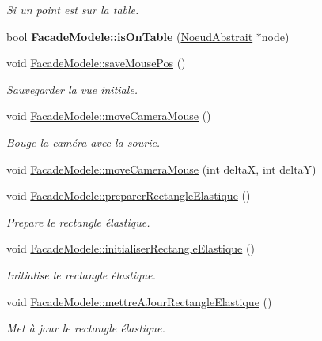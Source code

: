 \begin{DoxyCompactItemize}
\begin{DoxyCompactList}\small\item\em Si un point est sur la table. \end{DoxyCompactList}\item 
\hypertarget{group__inf2990_ga842a9426f91665baed35ec654cec6a20}{bool {\bfseries Facade\-Modele\-::is\-On\-Table} (\hyperlink{class_noeud_abstrait}{Noeud\-Abstrait} $\ast$node)}\label{group__inf2990_ga842a9426f91665baed35ec654cec6a20}

\item 
void \hyperlink{group__inf2990_gafd140af6e52aa738d9f301d4d5ea6530}{Facade\-Modele\-::save\-Mouse\-Pos} ()
\begin{DoxyCompactList}\small\item\em Sauvegarder la vue initiale. \end{DoxyCompactList}\item 
void \hyperlink{group__inf2990_gaba7107809948a77f8ef3bf2240bc2bc4}{Facade\-Modele\-::move\-Camera\-Mouse} ()
\begin{DoxyCompactList}\small\item\em Bouge la caméra avec la sourie. \end{DoxyCompactList}\item 
void \hyperlink{group__inf2990_ga2cab5c7a210e76f1c4f69d6ce2cb6403}{Facade\-Modele\-::move\-Camera\-Mouse} (int delta\-X, int delta\-Y)
\item 
void \hyperlink{group__inf2990_gaa5ea001f334158926e6c701478926ae9}{Facade\-Modele\-::preparer\-Rectangle\-Elastique} ()
\begin{DoxyCompactList}\small\item\em Prepare le rectangle élastique. \end{DoxyCompactList}\item 
void \hyperlink{group__inf2990_ga6ccf25bd92d3bae6dfeebaf051c768f4}{Facade\-Modele\-::initialiser\-Rectangle\-Elastique} ()
\begin{DoxyCompactList}\small\item\em Initialise le rectangle élastique. \end{DoxyCompactList}\item 
void \hyperlink{group__inf2990_ga382ae0540038d9ef65673af9d5d1b164}{Facade\-Modele\-::mettre\-A\-Jour\-Rectangle\-Elastique} ()
\begin{DoxyCompactList}\small\item\em Met à jour le rectangle élastique. \end{DoxyCompactList}\item 

\end{DoxyCompactItemize}
